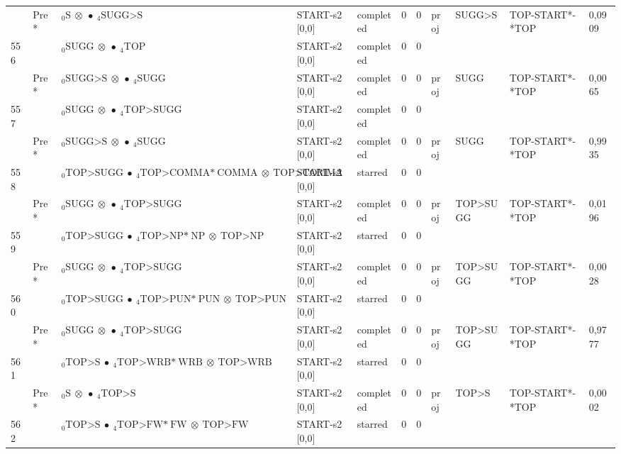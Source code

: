 \documentclass[10pt]{article}
\begin{document}
\begin{longtable}[htbp]{lllllllllll}
 & Pre *& $ {}_0 \textrm{S} \  \otimes \  \bullet \ {}_{4} \textrm{SUGG>S} $ & START-s2 [0,0] & completed & 0 & 0 & proj & SUGG>S & TOP-START*-*TOP & 0,0909 \\ 
556 & & $ {}_0 \textrm{SUGG} \  \otimes \  \bullet \ {}_{4} \textrm{TOP} $ & START-s2 [0,0] & completed & 0 & 0 & & & & \\ 
 & Pre *& $ {}_0 \textrm{SUGG>S} \  \otimes \  \bullet \ {}_{4} \textrm{SUGG} $ & START-s2 [0,0] & completed & 0 & 0 & proj & SUGG & TOP-START*-*TOP & 0,0065 \\ 
557 & & $ {}_0 \textrm{SUGG} \  \otimes \  \bullet \ {}_{4} \textrm{TOP>SUGG} $ & START-s2 [0,0] & completed & 0 & 0 & & & & \\ 
 & Pre *& $ {}_0 \textrm{SUGG>S} \  \otimes \  \bullet \ {}_{4} \textrm{SUGG} $ & START-s2 [0,0] & completed & 0 & 0 & proj & SUGG & TOP-START*-*TOP & 0,9935 \\ 
558 & & $ {}_0 \textrm{TOP>SUGG} \  \bullet \ {}_{4} \textrm{TOP>COMMA*} \ \textrm{COMMA} \  \otimes \ \textrm{TOP>COMMA} $ & START-s2 [0,0] & starred & 0 & 0 & & & & \\ 
 & Pre *& $ {}_0 \textrm{SUGG} \  \otimes \  \bullet \ {}_{4} \textrm{TOP>SUGG} $ & START-s2 [0,0] & completed & 0 & 0 & proj & TOP>SUGG & TOP-START*-*TOP & 0,0196 \\ 
559 & & $ {}_0 \textrm{TOP>SUGG} \  \bullet \ {}_{4} \textrm{TOP>NP*} \ \textrm{NP} \  \otimes \ \textrm{TOP>NP} $ & START-s2 [0,0] & starred & 0 & 0 & & & & \\ 
 & Pre *& $ {}_0 \textrm{SUGG} \  \otimes \  \bullet \ {}_{4} \textrm{TOP>SUGG} $ & START-s2 [0,0] & completed & 0 & 0 & proj & TOP>SUGG & TOP-START*-*TOP & 0,0028 \\ 
560 & & $ {}_0 \textrm{TOP>SUGG} \  \bullet \ {}_{4} \textrm{TOP>PUN*} \ \textrm{PUN} \  \otimes \ \textrm{TOP>PUN} $ & START-s2 [0,0] & starred & 0 & 0 & & & & \\ 
 & Pre *& $ {}_0 \textrm{SUGG} \  \otimes \  \bullet \ {}_{4} \textrm{TOP>SUGG} $ & START-s2 [0,0] & completed & 0 & 0 & proj & TOP>SUGG & TOP-START*-*TOP & 0,9777 \\ 
561 & & $ {}_0 \textrm{TOP>S} \  \bullet \ {}_{4} \textrm{TOP>WRB*} \ \textrm{WRB} \  \otimes \ \textrm{TOP>WRB} $ & START-s2 [0,0] & starred & 0 & 0 & & & & \\ 
 & Pre *& $ {}_0 \textrm{S} \  \otimes \  \bullet \ {}_{4} \textrm{TOP>S} $ & START-s2 [0,0] & completed & 0 & 0 & proj & TOP>S & TOP-START*-*TOP & 0,0002 \\ 
562 & & $ {}_0 \textrm{TOP>S} \  \bullet \ {}_{4} \textrm{TOP>FW*} \ \textrm{FW} \  \otimes \ \textrm{TOP>FW} $ & START-s2 [0,0] & starred & 0 & 0 & & & & \\ 

\end{longtable}
\end{document}
